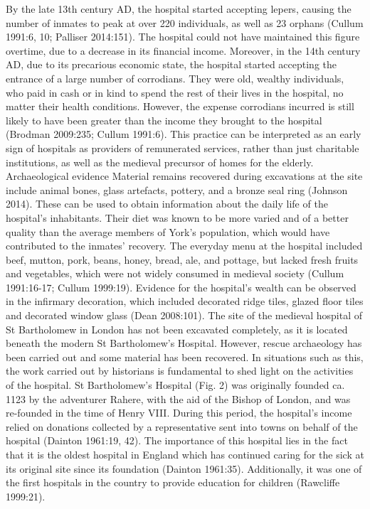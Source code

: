 \documentclass[%
	]{ijsra}
\begin{document}
By the late 13th century AD, the hospital started accepting lepers, causing the number of inmates to peak at over 220 individuals, as well as 23 orphans (Cullum 1991:6, 10; Palliser 2014:151). The hospital could not have maintained this figure overtime, due to a decrease in its financial income. Moreover, in the 14th century AD, due to its precarious economic state, the hospital started accepting the entrance of a large number of corrodians. They were old, wealthy individuals, who paid in cash or in kind to spend the rest of their lives in the hospital, no matter their health conditions. However, the expense corrodians incurred is still likely to have been greater than the income they brought to the hospital (Brodman 2009:235; Cullum 1991:6). This practice can be interpreted as an early sign of hospitals as providers of remunerated services, rather than just charitable institutions, as well as the medieval precursor of homes for the elderly.
Archaeological evidence
Material remains recovered during excavations at the site include animal bones, glass artefacts, pottery, and a bronze seal ring (Johnson 2014). These can be used to obtain information about the daily life of the hospital’s inhabitants. Their diet was known to be more varied and of a better quality than the average members of York’s population, which would have contributed to the inmates’ recovery. The everyday menu at the hospital included beef, mutton, pork, beans, honey, bread, ale, and pottage, but lacked fresh fruits and vegetables, which were not widely consumed in medieval society (Cullum 1991:16-17; Cullum 1999:19). 
Evidence for the hospital’s wealth can be observed in the infirmary decoration, which included decorated ridge tiles, glazed floor tiles and decorated window glass (Dean 2008:101). 
\IJSRAseparator
The site of the medieval hospital of St Bartholomew in London has not been excavated completely, as it is located beneath the modern St Bartholomew’s Hospital. However, rescue archaeology has been carried out and some material has been recovered.
In situations such as this, the work carried out by historians is fundamental to shed light on the activities of the hospital. St Bartholomew’s Hospital (Fig. 2) %
was originally founded ca. 1123 by the adventurer Rahere, with the aid of the Bishop of London, and was re-founded in the time of Henry VIII. During this period, the hospital’s income relied on donations collected by a representative sent into towns on behalf of the hospital (Dainton 1961:19, 42). 
The importance of this hospital lies in the fact that it is the oldest hospital in England which has continued caring for the sick at its original site since its foundation (Dainton 1961:35). Additionally, it was one of the first hospitals in the country to provide education for children (Rawcliffe 1999:21). 
\end{document}
